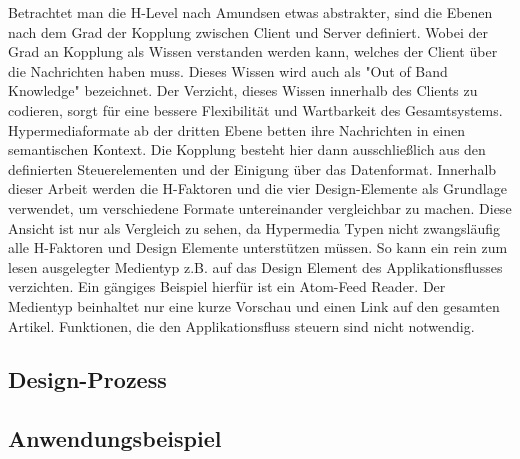 Betrachtet man die H-Level nach Amundsen etwas abstrakter, sind die Ebenen nach dem Grad der Kopplung zwischen Client und Server definiert. Wobei der Grad an Kopplung als Wissen verstanden werden kann, welches der Client über die Nachrichten haben muss. Dieses Wissen wird auch als "Out of Band Knowledge" bezeichnet. Der Verzicht, dieses Wissen innerhalb des Clients zu codieren, sorgt für eine bessere Flexibilität und Wartbarkeit des Gesamtsystems. Hypermediaformate ab der dritten Ebene betten ihre Nachrichten in einen semantischen Kontext. Die Kopplung besteht hier dann ausschließlich aus den definierten Steuerelementen und der Einigung über das Datenformat. Innerhalb dieser Arbeit werden die H-Faktoren und die vier Design-Elemente als Grundlage verwendet, um verschiedene Formate untereinander vergleichbar zu machen. Diese Ansicht ist nur als Vergleich zu sehen, da Hypermedia Typen nicht zwangsläufig alle H-Faktoren und Design Elemente unterstützen müssen. So kann ein rein zum lesen ausgelegter Medientyp z.B. auf das Design Element des Applikationsflusses verzichten. Ein gängiges Beispiel hierfür ist ein Atom-Feed Reader. Der Medientyp beinhaltet nur eine kurze Vorschau und einen Link auf den gesamten Artikel. Funktionen, die den Applikationsfluss steuern sind nicht notwendig.













\subsection{Design-Prozess}


\subsection{Anwendungsbeispiel}
